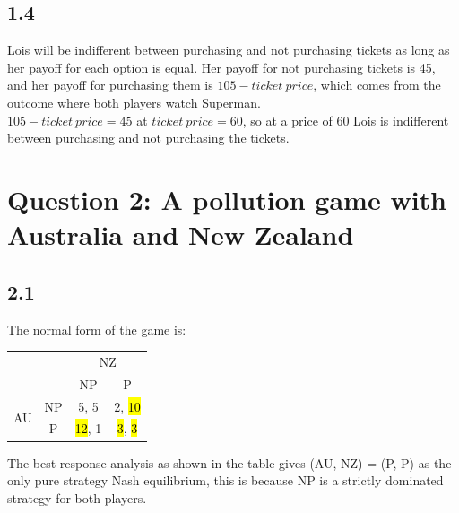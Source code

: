 \documentclass{article}
\begin{document}
\subsection*{1.4}
Lois will be indifferent between purchasing and not purchasing tickets as long as her payoff for each option is equal. Her payoff for not purchasing tickets is 45, and her payoff for purchasing them is $105-ticket\ price$, which comes from the outcome where both players watch Superman.\\[2mm]
$105-ticket\ price = 45$ at $ticket\ price = 60$, so at a price of 60 Lois is indifferent between purchasing and not purchasing the tickets.

\section*{Question 2: A pollution game with Australia and New Zealand}
\subsection*{2.1}
The normal form of the game is:
\begin{table}[H]
    \centering
    \begin{tabular}{@{}cccc@{}}
                                             &                         & \multicolumn{2}{c}{NZ}                                  \\ \cmidrule(l){3-4} 
                                             & \multicolumn{1}{c|}{}   & \multicolumn{1}{c|}{NP}    & \multicolumn{1}{c|}{P}     \\ \cmidrule(l){2-4} 
    \multicolumn{1}{c|}{\multirow{2}{*}{AU}} & \multicolumn{1}{c|}{NP} & \multicolumn{1}{c|}{5, 5}  & \multicolumn{1}{c|}{2, \hl{10}} \\ \cmidrule(l){2-4} 
    \multicolumn{1}{c|}{}                    & \multicolumn{1}{c|}{P}  & \multicolumn{1}{c|}{\hl{12}, 1} & \multicolumn{1}{c|}{\hl{3}, \hl{3}}  \\ \cmidrule(l){2-4} 
    \end{tabular}
\end{table}
\noindent The best response analysis as shown in the table gives (AU, NZ) = (P, P) as the only pure strategy Nash equilibrium, this is because NP is a strictly dominated strategy for both players.
\end{document}
